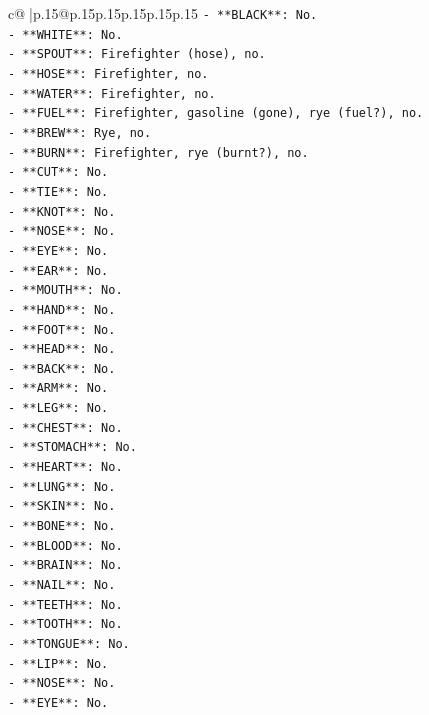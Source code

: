 \documentclass{article}
\begin{document}
{\begin{supertabular}{c@{$\;$}|p{.15\linewidth}@{}p{.15\linewidth}p{.15\linewidth}p{.15\linewidth}p{.15\linewidth}p{.15\linewidth}}
{{{\texttt{{-} **BLACK**: No.} \\
\texttt{{-} **WHITE**: No.} \\
\texttt{{-} **SPOUT**: Firefighter (hose), no.} \\
\texttt{{-} **HOSE**: Firefighter, no.} \\
\texttt{{-} **WATER**: Firefighter, no.} \\
\texttt{{-} **FUEL**: Firefighter, gasoline (gone), rye (fuel?), no.} \\
\texttt{{-} **BREW**: Rye, no.} \\
\texttt{{-} **BURN**: Firefighter, rye (burnt?), no.} \\
\texttt{{-} **CUT**: No.} \\
\texttt{{-} **TIE**: No.} \\
\texttt{{-} **KNOT**: No.} \\
\texttt{{-} **NOSE**: No.} \\
\texttt{{-} **EYE**: No.} \\
\texttt{{-} **EAR**: No.} \\
\texttt{{-} **MOUTH**: No.} \\
\texttt{{-} **HAND**: No.} \\
\texttt{{-} **FOOT**: No.} \\
\texttt{{-} **HEAD**: No.} \\
\texttt{{-} **BACK**: No.} \\
\texttt{{-} **ARM**: No.} \\
\texttt{{-} **LEG**: No.} \\
\texttt{{-} **CHEST**: No.} \\
\texttt{{-} **STOMACH**: No.} \\
\texttt{{-} **HEART**: No.} \\
\texttt{{-} **LUNG**: No.} \\
\texttt{{-} **SKIN**: No.} \\
\texttt{{-} **BONE**: No.} \\
\texttt{{-} **BLOOD**: No.} \\
\texttt{{-} **BRAIN**: No.} \\
\texttt{{-} **NAIL**: No.} \\
\texttt{{-} **TEETH**: No.} \\
\texttt{{-} **TOOTH**: No.} \\
\texttt{{-} **TONGUE**: No.} \\
\texttt{{-} **LIP**: No.} \\
\texttt{{-} **NOSE**: No.} \\
\texttt{{-} **EYE**: No.} \\
}}}
\end{supertabular}}
\end{document}
